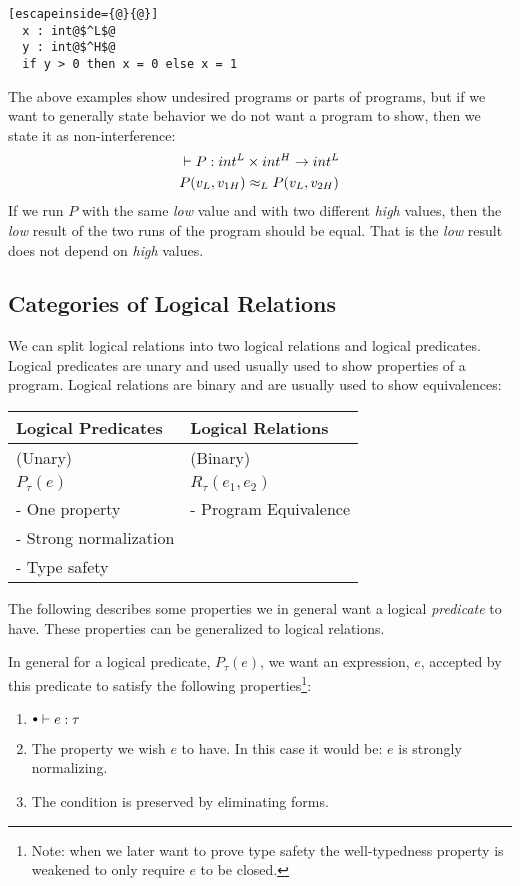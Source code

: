\begin{itemize}
\begin{itemize}
\begin{lstlisting}[escapeinside={@}{@}]
  x : int@$^L$@
  y : int@$^H$@
  if y > 0 then x = 0 else x = 1
        \end{lstlisting}
The above examples show undesired programs or parts of programs, but if we want to generally state behavior we do not want a program to show, then we state it as non-interference:
\begin{align*}
  & \vdash P :  int^L \times int^H \rightarrow int^L \\
  & P(v_L,v_{1H}) \approx_L P(v_L,v_{2H})
\end{align*}
If we run $P$ with the same \emph{low} value and with two different \emph{high} values, then the \emph{low} result of the two runs of the program should be equal. That is the \emph{low} result does not depend on \emph{high} values.
  \end{itemize}
\end{itemize}
\subsection*{Categories of Logical Relations}
We can split logical relations into two logical relations and logical predicates. Logical predicates are unary and used usually used to show properties of a program. Logical relations are binary and are usually used to show equivalences:\\
\begin{tabular}{l | l}
  Logical Predicates     & Logical Relations    \\
\hline
  (Unary)                & (Binary)             \\
  $P_\tau(e)$             & $R_\tau(e_1,e_2)$     \\
  - One property         & - Program Equivalence\\ %
  - Strong normalization & \\
  - Type safety          & \\
\end{tabular}
The following describes some properties we in general want a logical \emph{predicate} to have. These properties can be generalized to logical relations.

In general for a logical predicate, $P_\tau(e)$, we want an expression, $e$, accepted by this predicate to satisfy the following properties\footnote{Note: when we later want to prove type safety the well-typedness property is weakened to only require $e$ to be closed.}:
\begin{enumerate}
\item $\mtenv \vdash e : \tau$
\item The property we wish $e$ to have. In this case it would be: $e$ is strongly normalizing.
\item The condition is preserved by eliminating forms.
\end{enumerate}
